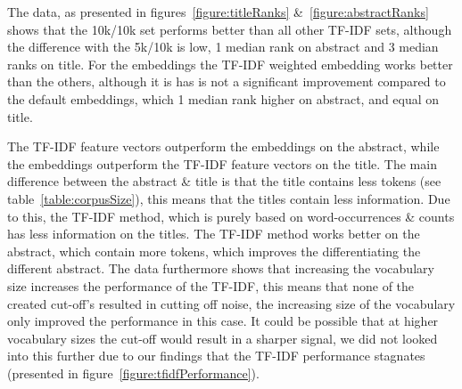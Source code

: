 \documentclass[../../Thesis.tex]{subfiles}
\begin{document}
\begin{jumpin}
The data, as presented in figures~\ref{figure:titleRanks} \&~\ref{figure:abstractRanks} shows that the 10k/10k set performs better than all other TF-IDF sets, although the difference with the 5k/10k is low, 1  median rank on abstract and 3 median ranks on title. For the embeddings the TF-IDF weighted embedding works better than the others, although it is has is not a significant improvement compared to the default embeddings, which 1 median rank higher on abstract, and equal on title. 

The TF-IDF feature vectors outperform the embeddings on the abstract, while the embeddings outperform the TF-IDF feature vectors on the title. The main difference between the abstract \& title is that the title contains less tokens (see table~\ref{table:corpusSize}), this means that the titles contain less information. Due to this, the TF-IDF method, which is purely based on word-occurrences \& counts has less information on the titles. The TF-IDF method works better on the abstract, which contain more tokens, which improves the differentiating the different abstract. The data furthermore shows that increasing the vocabulary size increases the performance of the TF-IDF, this means that none of the created cut-off's resulted in cutting off noise, the increasing size of the vocabulary only improved the performance in this case. It could be possible that at higher vocabulary sizes the cut-off would result in a sharper signal, we did not looked into this further due to our findings that the TF-IDF performance stagnates (presented in figure~\ref{figure:tfidfPerformance}).


\end{jumpin}
\end{document}
